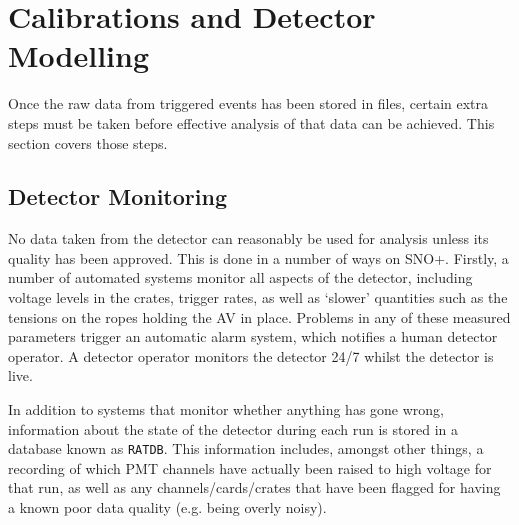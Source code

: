 \section{Calibrations and Detector Modelling}\label{sec:calibs_modelling}
Once the raw data from triggered events has been stored in files, certain extra steps must be taken before effective analysis of that data can be achieved. This section covers those steps.

\subsection{Detector Monitoring}
No data taken from the detector can reasonably be used for analysis unless its quality has been approved. This is done in a number of ways on SNO+. Firstly, a number of automated systems monitor all aspects of the detector, including voltage levels in the crates, trigger rates, as well as `slower' quantities such as the tensions on the ropes holding the AV in place. Problems in any of these measured parameters trigger an automatic alarm system, which notifies a human detector operator. A detector operator monitors the detector 24/7 whilst the detector is live.

In addition to systems that monitor whether anything has gone wrong, information about the state of the detector during each run is stored in a database known as \texttt{RATDB}. This information includes, amongst other things, a recording of which PMT channels have actually been raised to high voltage for that run, as well as any channels/cards/crates that have been flagged for having a known poor data quality (e.g. being overly noisy).


